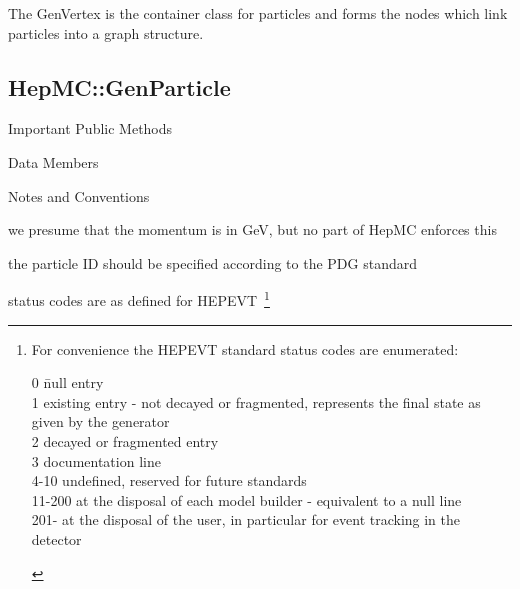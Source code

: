 \documentclass[11pt,letterpaper]{article}
\begin{document}
The GenVertex is the container class for particles and forms the nodes
which link particles into a graph structure.

%
%

\subsection{HepMC::GenParticle}
\begin{myitemize}{Important Public Methods}
\end{myitemize}
\begin{myitemize}{Data Members}
\end{myitemize}
\begin{myitemize}{Notes and Conventions}
  \item we presume that the momentum is in GeV, but no part of HepMC
        enforces this
  \item the particle ID should be specified according to the 
    PDG standard~\cite{Yao:2006tx}
  \item status codes are as defined for
    HEPEVT~\cite{stdhep5.05}\footnote{
      For convenience the HEPEVT standard status codes are enumerated:
      \begin{tabbing}
        0 \hspace{1cm} \= null entry \\
        1 \> existing entry - not decayed or fragmented, represents
        the final state as given by the generator \\
        2 \> decayed or fragmented entry \\
        3 \> documentation line \\
        4-10 \> undefined, reserved for future standards \\
        11-200 \> at the disposal of each model builder - equivalent
        to a null line \\
        201- \> at the disposal of the user, in particular for event
        tracking in the detector
      \end{tabbing}
      }
\end{myitemize}
\end{document}
